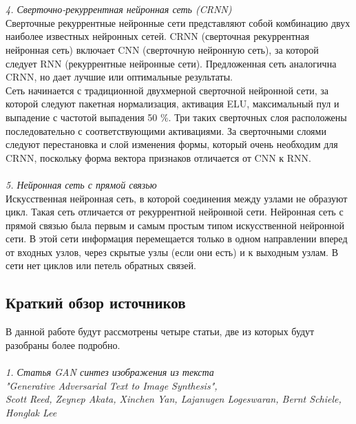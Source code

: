 \documentclass{article}
\begin{document}
    \\ \\
    \textit{4. Сверточно-рекуррентная нейронная сеть (CRNN)}
    \\
    Сверточные рекуррентные нейронные сети представляют собой комбинацию двух наиболее известных нейронных сетей. CRNN (сверточная рекуррентная нейронная сеть) включает CNN (сверточную нейронную сеть), за которой следует RNN (рекуррентные нейронные сети). Предложенная сеть аналогична CRNN, но дает лучшие или оптимальные результаты.
    \\
    Сеть начинается с традиционной двухмерной сверточной нейронной сети, за которой следуют пакетная нормализация, активация ELU, максимальный пул и выпадение с частотой выпадения 50 ${\%}$. Три таких сверточных слоя расположены последовательно с соответствующими активациями. За сверточными слоями следуют перестановка и слой изменения формы, который очень необходим для CRNN, поскольку форма вектора признаков отличается от CNN к RNN.
    \\ \\
    \textit{5. Нейронная сеть с прямой связью}
    \\
    Искусственная нейронная сеть, в которой соединения между узлами не образуют цикл. Такая сеть отличается от рекуррентной нейронной сети. Нейронная сеть с прямой связью была первым и самым простым типом искусственной нейронной сети. В этой сети информация перемещается только в одном направлении вперед от входных узлов, через скрытые узлы (если они есть) и к выходным узлам. В сети нет циклов или петель обратных связей.
    \newpage
    \begin{center} 
    \section{Краткий обзор источников}
    \end{center}
    \large 
    В данной работе будут рассмотрены четыре статьи, две из которых будут разобраны более подробно.
    \\ \\
    \textit{1. Статья GAN синтез изображения из текста
    \\
    "Generative Adversarial Text to Image Synthesis", 
    \\
    Scott Reed, Zeynep Akata, Xinchen Yan, Lajanugen Logeswaran, Bernt Schiele, Honglak Lee}
    \\
\end{document}
